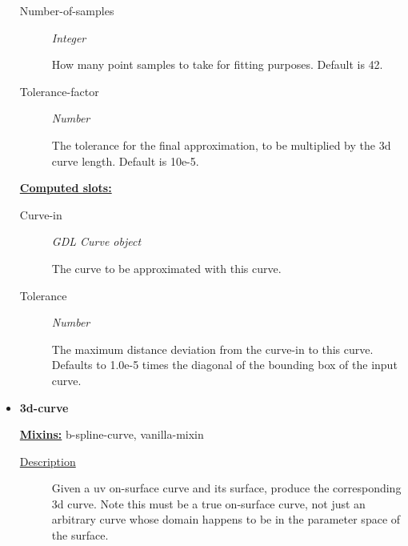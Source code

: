 \documentclass [11pt]{book}
\begin{document}
\begin{itemize}
\begin{description}
\item [Number-of-samples]
\emph{Integer}

 How many point samples to take for fitting
purposes. Default is 42.




\item [Tolerance-factor]
\emph{Number}

 The tolerance for the final approximation, to be
multiplied by the 3d curve length. Default is 10e-5.




\end{description}






\textbf{
\underline{Computed slots:}}

\begin{description}

\item [Curve-in]
\emph{GDL Curve object}

 The curve to be approximated with this curve.




\item [Tolerance]
\emph{Number}

 The maximum distance deviation from the curve-in to this curve.
Defaults to 1.0e-5 times the diagonal of the bounding box of the input curve.




\end{description}







\item {}
\label{prim:3d-curve}
\textbf{3d-curve}


\textbf{
\underline{Mixins:}} b-spline-curve, vanilla-mixin





\begin{description}

\item [
\underline{Description}]


Given a uv on-surface curve and its
surface, produce the corresponding 3d curve.  Note this must be a true
on-surface curve, not just an arbitrary curve whose domain happens to
be in the parameter space of the surface.




\end{description}
\end{itemize}
\end{document}
